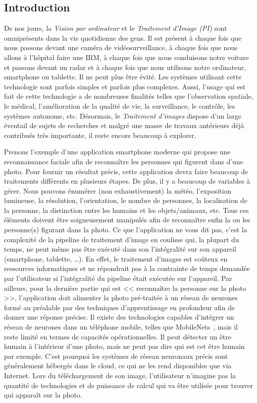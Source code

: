 \subsection*{Introduction}


De nos jours, la \emph{Vision par ordinateur} et le \emph{Traitement d'Image (PI)} sont omniprésents dans la vie
quotidienne des gens. Il est présent à chaque fois que nous passons devant une caméra de vidéosurveillance, à chaque
fois que nous allons à l'hôpital faire une IRM, à chaque fois que nous conduisons notre voiture et passons devant un
radar et à chaque fois que nous utilisons notre ordinateur, smartphone ou tablette. Il ne peut plus être évité. Les
systèmes utilisant cette technologie sont parfois simples et parfois plus complexes. Aussi, l'usage qui est fait de
cette technologie a de nombreuses finalités telles que l'observation spatiale, le médical, l'amélioration de la qualité
de vie, la surveillance, le contrôle, les systèmes autonome, etc. Désormais, le \emph{Traitement d'images} dispose d'un
large éventail de sujets de recherches et malgré une masse de travaux antérieurs déjà contribués très importante, il
reste encore beaucoup à explorer.

Prenons l'exemple d'une application smartphone moderne qui propose une reconnaissance faciale afin de reconnaître les
personnes qui figurent dans d'une photo. Pour fournir un résultat précis, cette application devra faire beaucoup de
traitements différents en plusieurs étapes. De plus, il y a beaucoup de variables à gérer. Nous pouvons énumérer (non
exhaustivement) la météo, l'exposition lumineuse, la résolution, l'orientation, le nombre de personnes, la localisation
de la personne, la distinction entre les humains et les objets/animaux, etc. Tous ces éléments doivent être
soigneusement manipulés afin de reconnaître enfin la ou les personne(s) figurant dans la photo. Ce que l'application ne
vous dit pas, c'est la complexité de la pipeline de traitement d'image en coulisse  qui, la plupart du temps, ne peut
même pas être exécuté dans son l'intégralité sur son appareil (smartphone, tablette, \ldots). En effet, le traitement
d'images est coûteux en ressources informatiques et ne répondrait pas à la contrainte de temps demandée par
l'utilisateur si l'intégralité du pipeline était exécutée sur l'appareil. Par ailleurs, pour la dernière partie qui est
<< reconnaître la personne sur la photo >>, l'application doit alimenter la photo pré-traitée à un réseau de neurones
formé au préalable par des techniques d'apprentissage en profondeur afin de donner une réponse précise. Il existe des
technologies capables d'intégrer un réseau de neurones dans un téléphone mobile, telles que
MobileNets~\parencite{howard.2017.mobilenets}, mais il reste limité en termes de capacités opérationnelles. Il peut
détecter un être humain à l'intérieur d'une photo, mais ne peut pas dire qui est cet être humain par exemple. C'est
pourquoi les systèmes de réseau neuronaux précis sont généralement hébergés dans le cloud, ce qui ne les rend
disponibles que via Internet. Lors du téléchargement de son image, l'utilisateur n'imagine pas la quantité de
technologies et de puissance de calcul qui va être utilisée pour trouver qui apparaît sur la photo.

